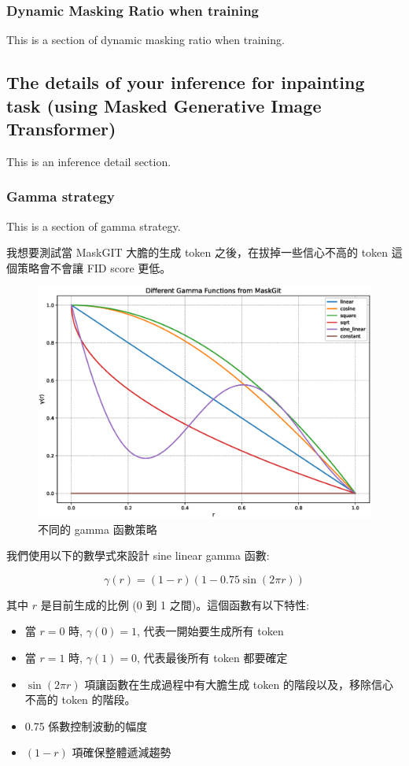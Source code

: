 \subsubsection{Dynamic Masking Ratio when training}
This is a section of dynamic masking ratio when training.

\subsection{The details of your inference for inpainting task (using Masked Generative Image Transformer)}
This is an inference detail section. 

\subsubsection{Gamma strategy}
This is a section of gamma strategy.

我想要測試當 MaskGIT 大膽的生成 token 之後，在拔掉一些信心不高的 token 這個策略會不會讓 FID score 更低。

\begin{figure}[h]
    \centering
    \includegraphics[width=\textwidth]{figures/gamma_functions}
    \caption{不同的 gamma 函數策略}
    \label{fig:gamma_functions}
\end{figure}

我們使用以下的數學式來設計 sine linear gamma 函數:

\begin{equation}
    \gamma(r) = (1-r)(1-0.75\sin(2\pi r))
\end{equation}

其中 $r$ 是目前生成的比例 (0 到 1 之間)。這個函數有以下特性:

\begin{itemize}
    \item 當 $r=0$ 時, $\gamma(0)=1$, 代表一開始要生成所有 token
    \item 當 $r=1$ 時, $\gamma(1)=0$, 代表最後所有 token 都要確定
    \item $\sin(2\pi r)$ 項讓函數在生成過程中有大膽生成 token 的階段以及，移除信心不高的 token 的階段。
    \item 0.75 係數控制波動的幅度
    \item $(1-r)$ 項確保整體遞減趨勢
\end{itemize}

